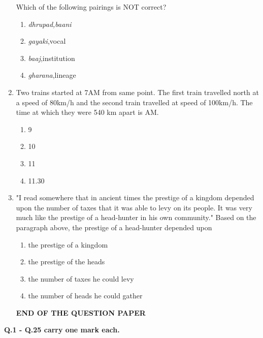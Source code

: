 \documentclass[12pt]{article}
\begin{document}
\begin{enumerate}[start=6,label=Q.\arabic*]
		Which of the following pairings is NOT correct?
		\begin{enumerate}[label=(\Alph*)]
			\item \textit{dhrupad,baani}
			\item \textit{gayaki},vocal
			\item \textit{baaj},institution
			\item \textit{gharana},lineage
		\end{enumerate}
		\vfill
		\newpage
	\item Two trains started at 7AM from same point. The first train travelled north at a speed of 80km/h and the second train travelled at speed of 100km/h. The time at which they were 540 km apart is \underline{\hspace{2cm}}AM.
		\begin{multicols}{4}
			\begin{enumerate}[label=(\Alph*)]
				\item 9 \item 10 \item 11 \item 11.30
			\end{enumerate}
		\end{multicols}
	\item "I read somewhere that in ancient times the prestige of a kingdom depended upon the number of taxes that it was able to levy on its people. It was very much like the prestige of a head-hunter in his own community."\hfill
		Based on the paragraph above, the prestige of a head-hunter depended upon \underline{\hspace{2cm}}
		\begin{enumerate}[label=(\Alph*)]
			\item the prestige of a kingdom
			\item the prestige of the heads
			\item the number of taxes he could levy
			\item the number of heads he could gather
		\end{enumerate}
		\vspace{\baselineskip}
		\begin{center}
			{\textbf{END OF THE QUESTION PAPER}}
		\end{center}
		\newpage
\end{enumerate}
\setcounter{page}{1}
\noindent\textbf{Q.1 - Q.25 carry one mark each.}
\end{document}
